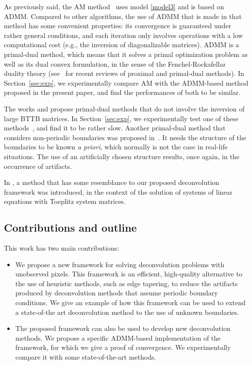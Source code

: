\documentclass[10pt,twocolumn,twoside]{IEEEtran}
\begin{document}
As previously said, the AM method~\cite{Almeida2013a,Matakos2013} uses model \eqref{model3} and is based on ADMM. Compared to other algorithms, the use of ADMM that is made in that method has some convenient properties: its convergence is guaranteed under rather general conditions, and each iteration only involves operations with a low computational cost (e.g., the inversion of diagonalizable matrices). ADMM is a primal-dual method, which means that it solves a primal optimization problem as well as its dual convex formulation, in the sense of the Fenchel-Rockafellar duality theory (see~\cite{Combettes2009, Parikh2013, Komodakis2014} for recent reviews of proximal and primal-dual methods). In Section~\ref{sec:exp}, we experimentally compare AM with the ADMM-based method proposed in the present paper, and find the performances of both to be similar.

The works \cite{Condat2013} and \cite{Combettes2014} propose primal-dual methods that do not involve the inversion of large BTTB matrices. In Section~\ref{sec:exp}, we experimentally test one of these methods~\cite{Condat2013}, and find it to be rather slow. Another primal-dual method that considers non-periodic boundaries was proposed in~\cite{OConnor2014}. It needs the structure of the boundaries to be known \textit{a priori}, which normally is not the case in real-life situations. The use of an artificially chosen structure results, once again, in the occurrence of artifacts.

In \cite{Ferreira2010}, a method that has some resemblance to our proposed deconvolution framework was introduced, in the context of the solution of systems of linear equations with Toeplitz system matrices.



\subsection{Contributions and outline}

This work has two main contributions:
\begin{itemize}
	\item We propose a new framework for solving deconvolution problems with unobserved pixels. This framework is an efficient, high-quality alternative to the use of heuristic methods, such as edge tapering, to reduce the artifacts produced by deconvolution methods that assume periodic boundary conditions.  We give an example of how this framework can be used to extend a state-of-the art deconvolution method to the use of unknown boundaries.

   \item The proposed framework can also be used to develop new deconvolution methods. We propose a specific ADMM-based implementation of the framework, for which we give a proof of convergence. We experimentally compare it with some state-of-the-art methods.
\end{itemize}
\end{document}
